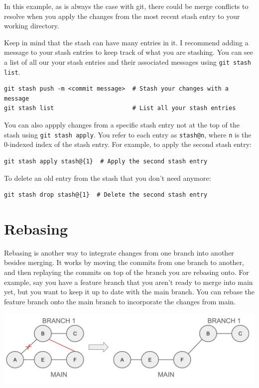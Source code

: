 \documentclass[fleqn]{article}
\begin{document}
In this example, as is always the case with git, there could be merge conflicts
to resolve when you apply the changes from the most recent stash entry to your
working directory.

Keep in mind that the stash can have many entries in it. I recommend adding a
message to your stash entries to keep track of what you are stashing. You can 
see a list of all our your stash entries and their associated messages using
\texttt{git stash list}.

\begin{lstlisting}
git stash push -m <commit message>  # Stash your changes with a message
git stash list                      # List all your stash entries
\end{lstlisting}

You can also appply changes from a specific stash entry not at the top of the
stash using \texttt{git stash apply}. You refer to each entry as
\texttt{stash@n}, where \texttt{n} is the 0-indexed index of the stash entry.
For example, to apply the second stash entry:

\begin{lstlisting}
git stash apply stash@{1}  # Apply the second stash entry
\end{lstlisting}

To delete an old entry from the stash that you don't need anymore:

\begin{lstlisting}
git stash drop stash@{1}  # Delete the second stash entry
\end{lstlisting}

\pagebreak

\section*{Rebasing}

Rebasing is another way to integrate changes from one branch into another
besides merging. It works by moving the commits from one branch to another, and
then replaying the commits on top of the branch you are rebasing onto. For
example, say you have a feature branch that you aren't ready to merge into main
yet, but you want to keep it up to date with the main branch. You can rebase the
feature branch onto the main branch to incorporate the changes from main.

\begin{center}
    \includegraphics[scale=0.4]{rebase.png}
\end{center}
\end{document}
